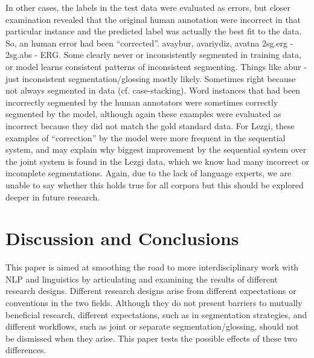 In other cases, the labels in the test data were evaluated as errors, but closer examination revealed that the original human annotation were incorrect in that particular instance and the predicted label was actually the best fit to the data. So, an human error had been ``corrected''. 
avaybur, avariydiz, avatna 2sg.erg - 2sg.abs - ERG.  Some clearly never or inconsistently segmented in training data, or model learns consistent patterns of inconsistent segmenting. Things like  abur -\textrangle{} just inconsistent segmentation/glossing mostly likely. Sometimes right because not always segmented in data (cf. case-stacking). 
Word instances that had been incorrectly segmented by the human annotators were sometimes correctly segmented by the model, although again these examples were evaluated as incorrect because they did not match the gold standard data. For Lezgi, these examples of ``correction'' by the model were more frequent in the sequential system, and may explain why biggest improvement by the sequential system over the joint system is found in the Lezgi data, which we know had many incorrect or incomplete segmentations.  Again, due to the lack of language experts, we are unable to say whether this holds true for all corpora but this should be explored deeper in future research.


\section{Discussion and Conclusions}
\label{sec:conclusion}

This paper is aimed at smoothing the road to more interdisciplinary work with NLP and linguistics by articulating and examining the results of different research designs. Different research designs arise from different expectations or conventions in the two fields. Although they do not present barriers to mutually beneficial research, different expectations, such as in segmentation strategies, and different workflows, such as joint or separate segmentation/glossing, should not be dismissed when they arise. This paper tests the possible effects of these two differences.


